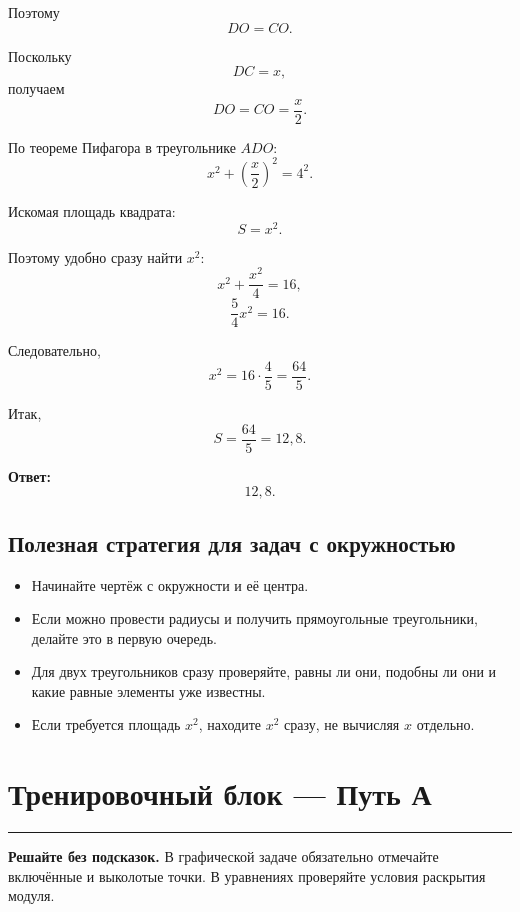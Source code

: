\documentclass[a4paper,12pt]{article}
\newcommand{\sectionrule}{%
  \par
  \vspace{-0.35em}%
  {\color{accent}\rule{\linewidth}{0.6pt}}%
  \vspace{0.6em}%
}
\newcommand{\key}[1]{\textcolor{darkaccent}{\textbf{#1}}}
\begin{document}
Поэтому
\[
DO=CO.
\]

Поскольку
\[
DC=x,
\]
получаем
\[
DO=CO=\frac{x}{2}.
\]

По теореме Пифагора в треугольнике \(ADO\):
\[
x^2+\left(\frac{x}{2}\right)^2=4^2.
\]

Искомая площадь квадрата:
\[
S=x^2.
\]

Поэтому удобно сразу найти \(x^2\):
\[
x^2+\frac{x^2}{4}=16,
\]
\[
\frac54x^2=16.
\]

Следовательно,
\[
x^2
=
16\cdot\frac45
=
\frac{64}{5}.
\]

Итак,
\[
S=\frac{64}{5}=12{,}8.
\]

\key{Ответ:}
\[
12{,}8.
\]

\subsection*{Полезная стратегия для задач с окружностью}

\begin{itemize}
  \item Начинайте чертёж с окружности и её центра.

  \item Если можно провести радиусы и получить прямоугольные
  треугольники, делайте это в первую очередь.

  \item Для двух треугольников сразу проверяйте, равны ли они,
  подобны ли они и какие равные элементы уже известны.

  \item Если требуется площадь \(x^2\), находите \(x^2\) сразу,
  не вычисляя \(x\) отдельно.
\end{itemize}


\clearpage

\section*{Тренировочный блок --- Путь А}
\sectionrule

\textbf{Решайте без подсказок.}
В графической задаче обязательно отмечайте включённые и выколотые
точки. В уравнениях проверяйте условия раскрытия модуля.
\end{document}
